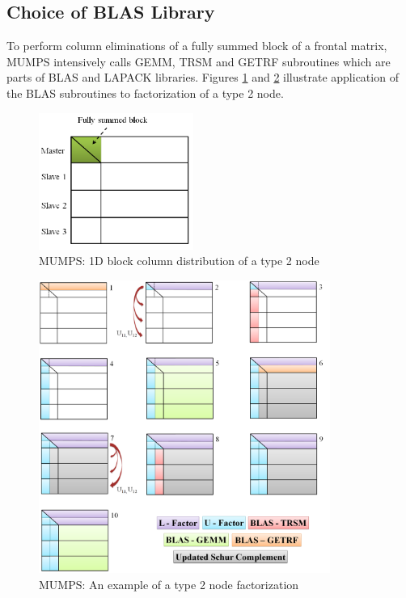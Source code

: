 \subsection{Choice of BLAS Library}
\label{subseq:blas-comparison}


To perform column eliminations of a fully summed block of a frontal matrix, MUMPS intensively calls GEMM, TRSM and GETRF subroutines which are parts of BLAS and LAPACK libraries. Figures \ref{fig:mumps:type-2-frontal-matrix} and  \ref{fig:mumps:steps-of-type-2-factorization} illustrate application of the BLAS subroutines to factorization of a type 2 node.\\


\figpointer{\ref{fig:mumps:type-2-frontal-matrix}}
\begin{figure}[htpb]
  \centering
  \includegraphics[width=0.45\textwidth]{figures/chapter-2/mumps-type-2-frontal-matrix.png}
\caption{MUMPS: 1D block column distribution of a type 2 node}
\label{fig:mumps:type-2-frontal-matrix}
\end{figure}


\figpointer{\ref{fig:mumps:steps-of-type-2-factorization}}
\begin{figure}[htpb]
  \centering
  \includegraphics[width=0.85\textwidth]{figures/chapter-2/mumps-type-2-part-1.png}
\caption{MUMPS: An example of a type 2 node factorization}
\label{fig:mumps:steps-of-type-2-factorization}
\end{figure}


